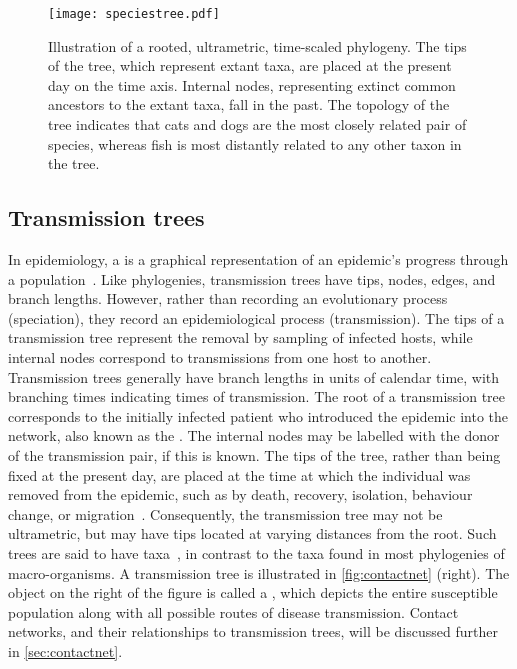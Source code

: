 \begin{figure}[ht]
  \centering
  \texttt{[image: speciestree.pdf]}
  \caption[Illustration of a rooted, ultrametric, time-scaled phylogeny.]
    {Illustration of a rooted, ultrametric, time-scaled phylogeny. The tips of
      the tree, which represent extant taxa, are placed at the present day on
      the time axis. Internal nodes, representing extinct common ancestors to
      the extant taxa, fall in the past. The topology of the tree indicates
      that cats and dogs are the most closely related pair of species, whereas
      fish is most distantly related to any other taxon in the tree.}
  \label{fig:speciestree}
\end{figure}

\subsection{Transmission trees}

In epidemiology, a  is a graphical representation of an
epidemic's progress through a population~\autocite{ypma2013relating}. Like
phylogenies, transmission trees have tips, nodes, edges, and branch lengths.
However, rather than recording an evolutionary process (speciation), they
record an epidemiological process (transmission). The tips of a transmission
tree represent the removal by sampling of infected hosts, while internal nodes
correspond to transmissions from one host to another. Transmission trees
generally have branch lengths in units of calendar time, with branching times
indicating times of transmission. The root of a transmission tree corresponds
to the initially infected patient who introduced the epidemic into the network,
also known as the . The internal nodes may be labelled with
the donor of the transmission pair, if this is known. The tips of the tree,
rather than being fixed at the present day, are placed at the time at which the
individual was removed from the epidemic, such as by death, recovery,
isolation, behaviour change, or migration~\autocite{stadler2013uncovering}.
Consequently, the transmission tree may not be ultrametric, but may have tips
located at varying distances from the root. Such trees are said to have
 taxa~\autocite{drummond2003measurably}, in contrast to
the  taxa found in most phylogenies of macro-organisms. A
transmission tree is illustrated in \cref{fig:contactnet} (right). 
The object on the right of the figure is called a , which depicts the entire susceptible population along with all
possible routes of disease transmission. Contact networks, and their
relationships to transmission trees, will be discussed further in
\cref{sec:contactnet}.

